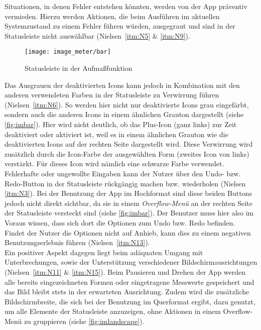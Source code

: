 Situationen, in denen Fehler entstehen könnten, werden von der App präventiv vermieden.
Hierzu werden Aktionen, die beim Ausführen im aktuellen Systemzustand zu einem Fehler führen würden, ausgegraut und sind in der Statusleiste nicht auswählbar (Nielsen~\autoref{itm:N5} \& \autoref{itm:N9}). \\

\begin{wrapfigure}{R}{0.4\textwidth}
  \centering
  \texttt{[image: image\_meter/bar]}
  \caption{Statusleiste in der Aufmaßfunktion}
  \label{fig:imbar}
\end{wrapfigure}

Das Ausgrauen der deaktivierten Icons kann jedoch in Kombination mit den anderen verwendeten Farben in der Statusleiste zu Verwirrung führen (Nielsen~\autoref{itm:N6}).
So werden hier nicht nur deaktivierte Icons grau eingefärbt, sondern auch die anderen Icons in einem ähnlichen Grauton dargestellt (siehe \autoref{fig:imbar}).
Hier wird nicht deutlich, ob das Plus-Icon (ganz links) zur Zeit deaktiviert oder aktiviert ist, weil es in einem ähnlichen Grauton wie die deaktivierten Icons auf der rechten Seite dargestellt wird.
Diese Verwirrung wird zusätzlich durch die Icon-Farbe der ausgewählten Form (zweites Icon von links) verstärkt.
Für dieses Icon wird nämlich eine schwarze Farbe verwendet. \\

Fehlerhafte oder ungewollte Eingaben kann der Nutzer über den Undo- bzw. Redo-Button in der Statusleiste rückgängig machen bzw. wiederholen (Nielsen \autoref{itm:N3}).
Bei der Benutzung der App im Hochformat sind diese beiden Buttons jedoch nicht direkt sichtbar, da sie in einem \emph{Overflow-Menü} an der rechten Seite der Statusleiste versteckt sind (siehe \autoref{fig:imbar}).
Der Benutzer muss hier also im Voraus wissen, dass sich dort die Optionen zum Undo bzw. Redo befinden.
Findet der Nutzer die Optionen nicht auf Anhieb, kann dies zu einem negativen Benutzungserlebnis führen (Nielsen~\autoref{itm:N13}). \\

Ein positiver Aspekt dagegen liegt beim adäquaten Umgang mit Unterbrechungen, sowie der Unterstützung verschiedener Bildschirmausrichtungen (Nielsen~\autoref{itm:N11} \& \autoref{itm:N15}).
Beim Pausieren und Drehen der App werden alle bereits eingezeichneten Formen oder eingetragene Messwerte gespeichert und das Bild bleibt stets in der erwarteten Ausrichtung.
Zudem wird die zusätzliche Bildschirmbreite, die sich bei der Benutzung im Querformat ergibt, dazu genutzt, um alle Elemente der Statusleiste anzuzeigen, ohne Aktionen in einem Overflow-Menü zu gruppieren (siehe \autoref{fig:imlandscape}).

